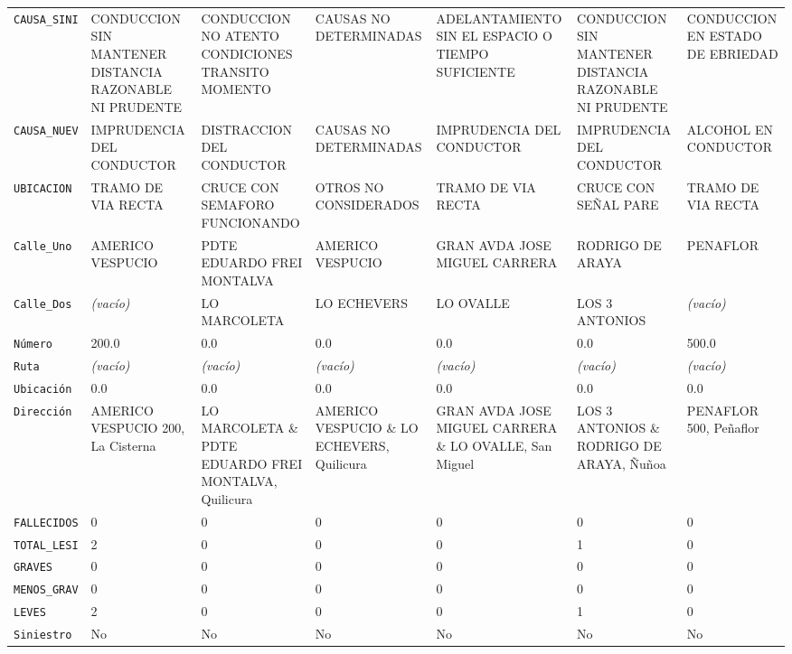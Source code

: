 \documentclass[10pt]{article}
\begin{document}
\begin{xltabular}{\linewidth}{@{}p{4.3cm} Y Y Y Y Y Y @{}}
\texttt{CAUSA\_\allowbreak{}SINI} & CONDUCCION SIN MANTENER DISTANCIA RAZONABLE NI PRUDENTE & CONDUCCION NO ATENTO CONDICIONES TRANSITO MOMENTO & CAUSAS NO DETERMINADAS & ADELANTAMIENTO SIN EL ESPACIO O TIEMPO SUFICIENTE & CONDUCCION SIN MANTENER DISTANCIA RAZONABLE NI PRUDENTE & CONDUCCION EN ESTADO DE EBRIEDAD \\
\texttt{CAUSA\_\allowbreak{}NUEV} & IMPRUDENCIA DEL CONDUCTOR & DISTRACCION DEL CONDUCTOR & CAUSAS NO DETERMINADAS & IMPRUDENCIA DEL CONDUCTOR & IMPRUDENCIA DEL CONDUCTOR & ALCOHOL EN CONDUCTOR \\
\texttt{UBICACION} & TRAMO DE VIA RECTA & CRUCE CON SEMAFORO FUNCIONANDO & OTROS NO CONSIDERADOS & TRAMO DE VIA RECTA & CRUCE CON SEÑAL PARE & TRAMO DE VIA RECTA \\
\texttt{Calle\_\allowbreak{}Uno} & AMERICO VESPUCIO & PDTE EDUARDO FREI MONTALVA & AMERICO VESPUCIO & GRAN AVDA JOSE MIGUEL CARRERA & RODRIGO DE ARAYA & PENAFLOR \\
\texttt{Calle\_\allowbreak{}Dos} & \textit{\color{gris}(vacío)} & LO MARCOLETA & LO ECHEVERS & LO OVALLE & LOS 3 ANTONIOS & \textit{\color{gris}(vacío)} \\
\texttt{Número} & 200.0 & 0.0 & 0.0 & 0.0 & 0.0 & 500.0 \\
\texttt{Ruta} & \textit{\color{gris}(vacío)} & \textit{\color{gris}(vacío)} & \textit{\color{gris}(vacío)} & \textit{\color{gris}(vacío)} & \textit{\color{gris}(vacío)} & \textit{\color{gris}(vacío)} \\
\texttt{Ubicación} & 0.0 & 0.0 & 0.0 & 0.0 & 0.0 & 0.0 \\
\texttt{Dirección} & AMERICO VESPUCIO 200, La Cisterna & LO MARCOLETA \& PDTE EDUARDO FREI MONTALVA, Quilicura & AMERICO VESPUCIO \& LO ECHEVERS, Quilicura & GRAN AVDA JOSE MIGUEL CARRERA \& LO OVALLE, San Miguel & LOS 3 ANTONIOS \& RODRIGO DE ARAYA, Ñuñoa & PENAFLOR 500, Peñaflor \\
\texttt{FALLECIDOS} & 0 & 0 & 0 & 0 & 0 & 0 \\
\texttt{TOTAL\_\allowbreak{}LESI} & 2 & 0 & 0 & 0 & 1 & 0 \\
\texttt{GRAVES} & 0 & 0 & 0 & 0 & 0 & 0 \\
\texttt{MENOS\_\allowbreak{}GRAV} & 0 & 0 & 0 & 0 & 0 & 0 \\
\texttt{LEVES} & 2 & 0 & 0 & 0 & 1 & 0 \\
\texttt{Siniestro} & No & No & No & No & No & No \\

\end{xltabular}
\end{document}

